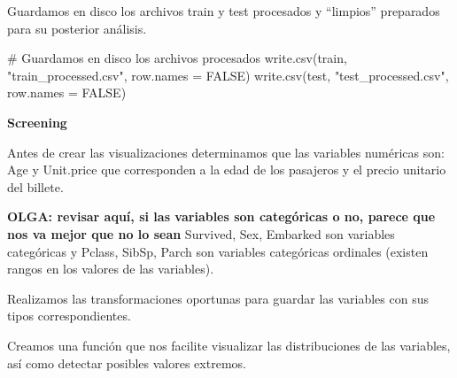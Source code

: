 \documentclass[
]{article}
\newenvironment{Shaded}{\begin{snugshade}}{\end{snugshade}}
\newcommand{\CommentTok}[1]{\textcolor[rgb]{0.50,0.62,0.50}{#1}}
\newcommand{\DataTypeTok}[1]{\textcolor[rgb]{0.87,0.87,0.75}{#1}}
\newcommand{\KeywordTok}[1]{\textcolor[rgb]{0.94,0.87,0.69}{#1}}
\newcommand{\NormalTok}[1]{\textcolor[rgb]{0.80,0.80,0.80}{#1}}
\newcommand{\OperatorTok}[1]{\textcolor[rgb]{0.94,0.94,0.82}{#1}}
\newcommand{\OtherTok}[1]{\textcolor[rgb]{0.94,0.94,0.56}{#1}}
\newcommand{\StringTok}[1]{\textcolor[rgb]{0.80,0.58,0.58}{#1}}
\begin{document}
Guardamos en disco los archivos train y test procesados y ``limpios''
preparados para su posterior análisis.

\begin{Shaded}
\begin{Highlighting}[]
\CommentTok{# Guardamos en disco los archivos procesados}
\KeywordTok{write.csv}\NormalTok{(train, }\StringTok{"train_processed.csv"}\NormalTok{, }\DataTypeTok{row.names =} \OtherTok{FALSE}\NormalTok{)}
\KeywordTok{write.csv}\NormalTok{(test, }\StringTok{"test_processed.csv"}\NormalTok{, }\DataTypeTok{row.names =} \OtherTok{FALSE}\NormalTok{)}
\end{Highlighting}
\end{Shaded}

\textbf{Screening}

Antes de crear las visualizaciones determinamos que las variables
numéricas son: Age y Unit.price que corresponden a la edad de los
pasajeros y el precio unitario del billete.

\textbf{OLGA: revisar aquí, si las variables son categóricas o no,
parece que nos va mejor que no lo sean} Survived, Sex, Embarked son
variables categóricas y Pclass, SibSp, Parch son variables categóricas
ordinales (existen rangos en los valores de las variables).

Realizamos las transformaciones oportunas para guardar las variables con
sus tipos correspondientes.

\begin{Shaded}
\end{Shaded}

Creamos una función que nos facilite visualizar las distribuciones de
las variables, así como detectar posibles valores extremos.
\end{document}

